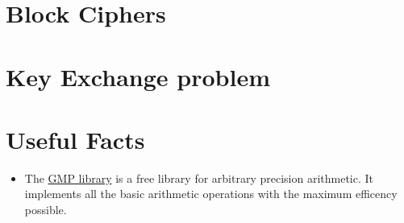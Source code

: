 \documentclass[12pt, a4paper, english]{report}
\begin{document}
\chapter{Block Ciphers}


\chapter{Key Exchange problem}


\chapter*{Useful Facts}
\begin{itemize}
    \item The \href{https://gmplib.org/}{GMP library} is a free library for arbitrary precision arithmetic. It implements all the basic arithmetic operations with the maximum efficency possible.
\end{itemize}

\listofalgorithms
\listoftheorems[ignoreall, show={theorem}]

\begingroup               %
  \let\clearpage\relax    %
  \renewcommand{\listtheoremname}{List of Lemmas}
  \listoftheorems[ignoreall, show={lemma}]
\endgroup
\end{document}
